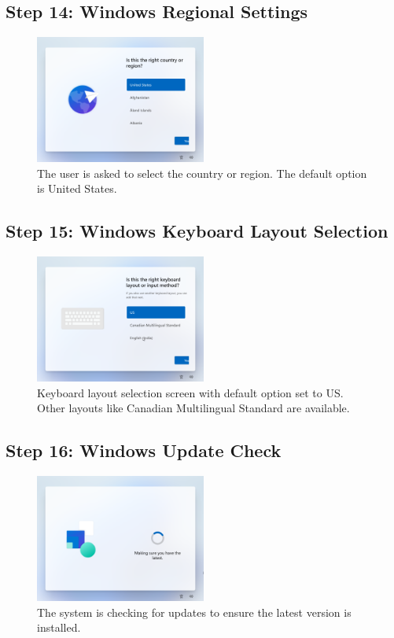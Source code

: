 \documentclass{article}
\begin{document}
\subsection{Step 14: Windows Regional Settings}
\begin{figure}[H]
    \centering
    \includegraphics[width=0.5\textwidth]{2024-09-17_15-18-27.png}
    \caption{The user is asked to select the country or region. The default option is United States.}
\end{figure}

\subsection{Step 15: Windows Keyboard Layout Selection}
\begin{figure}[H]
    \centering
    \includegraphics[width=0.5\textwidth]{2024-09-17_15-18-38.png}
    \caption{Keyboard layout selection screen with default option set to US. Other layouts like Canadian Multilingual Standard are available.}
\end{figure}

\subsection{Step 16: Windows Update Check}
\begin{figure}[H]
    \centering
    \includegraphics[width=0.5\textwidth]{2024-09-17_15-19-19.png}
    \caption{The system is checking for updates to ensure the latest version is installed.}
\end{figure}
\end{document}
